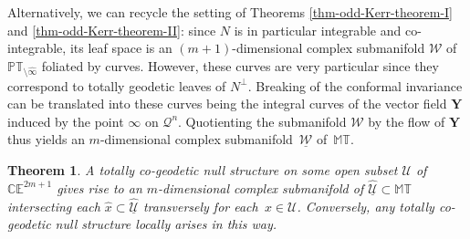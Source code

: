 \documentclass[10pt,a4paper]{amsart}
\numberwithin{equation}{section}
\newtheorem{Theorem}{Theorem}[section]
\newcommand{\mc} [1]{\mathcal{#1}}
\newcommand{\PT} {\mathbb{PT}}
\newcommand{\T} {\mathbb{T}}
\newcommand{\E} {\mathbb{E}}
\newcommand{\M} {\mathbb{M}}
\newcommand{\C} {\mathbb{C}}
\begin{document}
 Alternatively, we can recycle the setting of Theorems \ref{thm-odd-Kerr-theorem-I} and \ref{thm-odd-Kerr-theorem-II}: since $N$ is in particular integrable and co-integrable, its leaf space is an $(m+1)$-dimensional complex submanifold $\mc{W}$ of $\PT_{\setminus \widehat{\infty}}$ foliated by curves. However, these curves are very particular since they correspond to totally geodetic leaves of $N^\perp$. Breaking of the conformal invariance can be translated into these curves being the integral curves of the vector f\/ield $\bm{Y}$ induced by the point $\infty$ on $\mc{Q}^n$. Quotienting the submanifold $\mc{W}$ by the f\/low of $\bm{Y}$ thus yields an $m$-dimensional complex submanifold~$\underline{\mc{W}}$ of~$\M\T$.

\begin{Theorem}\label{thm-odd-Kerr-theorem-NC}
A totally co-geodetic null structure on some open subset $\mc{U}$ of $\C \E^{2m+1}$ gives rise to an $m$-dimensional complex submanifold of $\underline{\widehat{\mc{U}}} \subset \M\T$ intersecting each $\hat{x} \subset \underline{\widehat{\mc{U}}}$ transversely for each~$x \in \mc{U}$. Conversely, any totally co-geodetic null structure locally arises in this way.
\end{Theorem}
\end{document}
